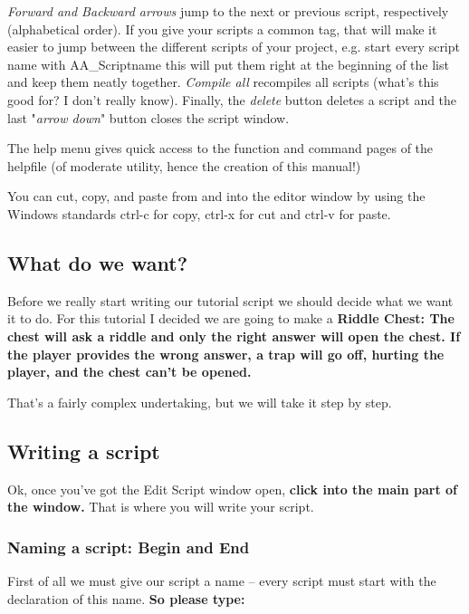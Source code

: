 \documentclass[
]{article}
\begin{document}
\emph{Forward and Backward arrows} jump to the next or previous script,
respectively (alphabetical order). If you give your scripts a common
tag, that will make it easier to jump between the different scripts of
your project, e.g. start every script name with AA\_Scriptname this will
put them right at the beginning of the list and keep them neatly
together. \emph{Compile all} recompiles all scripts (what's this good
for? I don't really know). Finally, the \emph{delete} button deletes a
script and the last "\emph{arrow down}" button closes the script window.

The help menu gives quick access to the function and command pages of
the helpfile (of moderate utility, hence the creation of this manual!)

You can cut, copy, and paste from and into the editor window by using
the Windows standards ctrl-c for copy, ctrl-x for cut and ctrl-v for
paste.

\hypertarget{what-do-we-want}{%
\subsection{What do we want?}\label{what-do-we-want}}

Before we really start writing our tutorial script we should decide what
we want it to do. For this tutorial I decided we are going to make a
\textbf{Riddle Chest: The chest will ask a riddle and only the right
answer will open the chest. If the player provides the wrong answer, a
trap will go off, hurting the player, and the chest can't be opened.}

That's a fairly complex undertaking, but we will take it step by step.

\hypertarget{writing-a-script}{%
\subsection{Writing a script}\label{writing-a-script}}

Ok, once you've got the Edit Script window open, \textbf{click into the
main part of the window.} That is where you will write your script.

\hypertarget{naming-a-script-begin-and-end}{%
\subsubsection{Naming a script: Begin and
End}\label{naming-a-script-begin-and-end}}

First of all we must give our script a name -- every script must start
with the declaration of this name. \textbf{So please type:}
\end{document}
